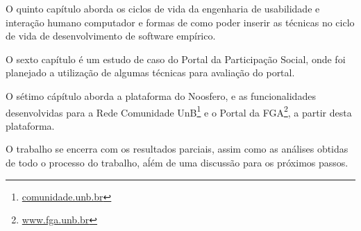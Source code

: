 	O quinto capítulo aborda os ciclos de vida da engenharia de usabilidade e interação humano computador e formas de como poder inserir as técnicas no ciclo de vida de desenvolvimento de software empírico.

	O sexto capítulo é um estudo de caso do Portal da Participação Social, onde foi planejado a utilização de algumas técnicas para avaliação do portal.

	O sétimo cápítulo aborda a plataforma do Noosfero, e as funcionalidades desenvolvidas para a Rede Comunidade UnB\footnote{\url{comunidade.unb.br}} e o Portal da FGA\footnote{\url{www.fga.unb.br}}, a partir desta plataforma.

	O trabalho se encerra com os resultados parciais, assim como as análises obtidas de todo o processo do trabalho, aĺém de uma discussão para os próximos passos.

	


